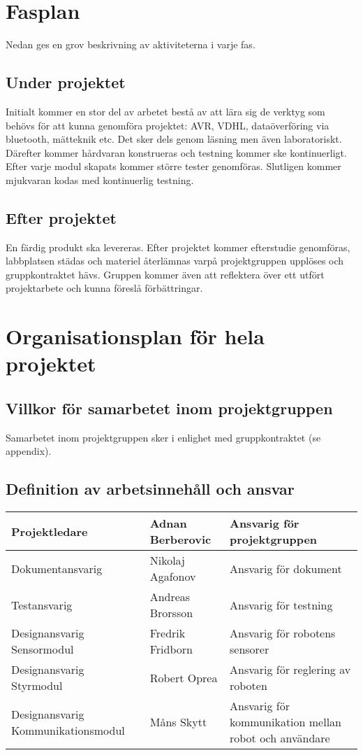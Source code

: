\documentclass[11pt]{article}
\begin{document}
\begin{flushleft}
\section{Fasplan}
Nedan ges en grov beskrivning av aktiviteterna i varje fas.
\subsection{Under projektet}
Initialt kommer en stor del av arbetet bestå av att lära sig de verktyg som behövs för att kunna genomföra projektet: AVR, VDHL, dataöverföring via bluetooth, mätteknik etc. Det sker dels genom läsning men även laboratoriskt. Därefter kommer hårdvaran konstrueras och testning kommer ske kontinuerligt. Efter varje modul skapats kommer större tester genomföras. Slutligen kommer mjukvaran kodas med kontinuerlig testning.

\subsection{Efter projektet}
En färdig produkt ska levereras. Efter projektet kommer efterstudie genomföras, labbplatsen städas och materiel återlämnas varpå projektgruppen upplöses och gruppkontraktet hävs. Gruppen kommer även att reflektera över ett utfört projektarbete och kunna föreslå förbättringar.
\pagebreak

\section{Organisationsplan för hela projektet} 

\subsection{Villkor för samarbetet inom projektgruppen}
Samarbetet inom projektgruppen sker i enlighet med gruppkontraktet (se appendix).

\subsection{Definition av arbetsinnehåll och ansvar}

\begin{tabu} to 1.05\textwidth { | X[c] | X[c] | X[c] | }
\hline
Projektledare & Adnan Berberovic & Ansvarig för projektgruppen \\
\hline
Dokumentansvarig & Nikolaj Agafonov & Ansvarig för dokument\\
\hline
Testansvarig & Andreas Brorsson & Ansvarig för testning \\ 
\hline
Designansvarig Sensormodul & Fredrik Fridborn  & Ansvarig för robotens sensorer\\
\hline
Designansvarig Styrmodul & Robert Oprea & Ansvarig för reglering av roboten\\
\hline
Designansvarig Kommunikationsmodul & Måns Skytt & Ansvarig för kommunikation mellan robot och användare \\
\hline
 \end{tabu}


\end{flushleft}
\end{document}
